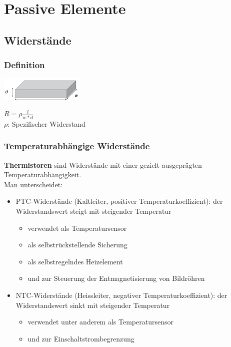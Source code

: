\section{Passive Elemente}

\subsection{Widerstände}

\subsubsection{Definition}
\begin{multicols}{2}
\includegraphics[width=0.3\textwidth]{pictures/widerstand.png}

\columnbreak

$R=\rho\frac{l}{w*d}$ \\
$\rho$: Spezifischer Widerstand
\end{multicols}


\subsubsection{Temperaturabhängige Widerstände}
\textbf{Thermistoren} sind Widerstände mit einer gezielt ausgeprägten
Temperaturabhängigkeit.\\Man unterscheidet:
\begin{itemize}
  \item PTC-Widerstände (Kaltleiter, positiver Temperaturkoeffizient): der
  Widerstandswert steigt mit steigender Temperatur
  \begin{itemize}
    \item verwendet als Temperatursensor
    \item als selbstrückstellende Sicherung
    \item als selbstregelndes Heizelement
    \item und zur Steuerung der Entmagnetisierung von Bildröhren
  \end{itemize}
  \item NTC-Widerstände (Heissleiter, negativer Temperaturkoeffizient): der
  Widerstandswert sinkt mit steigender Temperatur
  \begin{itemize}
    \item verwendet unter anderem als Temperatursensor
    \item und zur Einschaltstrombegrenzung
  \end{itemize}
\end{itemize}

